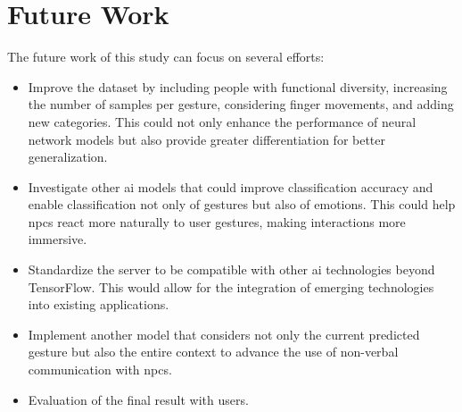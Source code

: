 \section{Future Work}

The future work of this study can focus on several efforts:

\begin{itemize}
    \item Improve the dataset by including people with functional diversity, increasing the number of samples per gesture, considering finger movements, and adding new categories. This could not only enhance the performance of neural network models but also provide greater differentiation for better generalization.
    \item Investigate other \gls{ai} models that could improve classification accuracy and enable classification not only of gestures but also of emotions. This could help \glspl{npc} react more naturally to user gestures, making interactions more immersive.
    \item Standardize the server to be compatible with other \gls{ai} technologies beyond TensorFlow. This would allow for the integration of emerging technologies into existing applications.
    \item Implement another model that considers not only the current predicted gesture but also the entire context to advance the use of non-verbal communication with \glspl{npc}.
    \item Evaluation of the final result with users.
\end{itemize}


